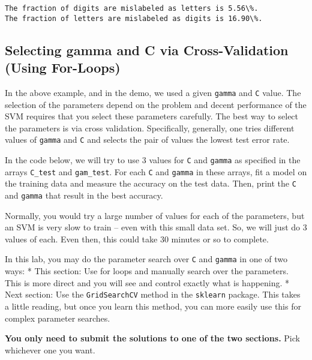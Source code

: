 \documentclass[11pt]{article}
\begin{document}
    \begin{Verbatim}[commandchars=\\\{\}]
The fraction of digits are mislabeled as letters is 5.56\%.
The fraction of letters are mislabeled as digits is 16.90\%.

    \end{Verbatim}

    \hypertarget{selecting-gamma-and-c-via-cross-validation-using-for-loops}{%
\subsection{Selecting gamma and C via Cross-Validation (Using
For-Loops)}\label{selecting-gamma-and-c-via-cross-validation-using-for-loops}}

In the above example, and in the demo, we used a given \texttt{gamma}
and \texttt{C} value. The selection of the parameters depend on the
problem and decent performance of the SVM requires that you select these
parameters carefully. The best way to select the parameters is via cross
validation. Specifically, generally, one tries different values of
\texttt{gamma} and \texttt{C} and selects the pair of values the lowest
test error rate.

In the code below, we will try to use 3 values for \texttt{C} and
\texttt{gamma} as specified in the arrays \texttt{C\_test} and
\texttt{gam\_test}. For each \texttt{C} and \texttt{gamma} in these
arrays, fit a model on the training data and measure the accuracy on the
test data. Then, print the \texttt{C} and \texttt{gamma} that result in
the best accuracy.

Normally, you would try a large number of values for each of the
parameters, but an SVM is very slow to train -- even with this small
data set. So, we will just do 3 values of each. Even then, this could
take 30 minutes or so to complete.

In this lab, you may do the parameter search over \texttt{C} and
\texttt{gamma} in one of two ways: * This section: Use for loops and
manually search over the parameters. This is more direct and you will
see and control exactly what is happening. * Next section: Use the
\texttt{GridSearchCV} method in the \texttt{sklearn} package. This takes
a little reading, but once you learn this method, you can more easily
use this for complex parameter searches.

\textbf{You only need to submit the solutions to one of the two
sections.} Pick whichever one you want.
\end{document}
